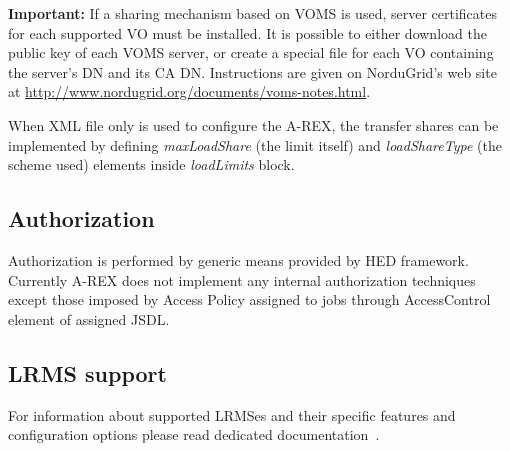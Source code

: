 \documentclass{article}                            %
\begin{document}
\textbf{Important:} If a sharing mechanism based on VOMS is used,
server certificates for each supported VO must be installed. It is
possible to either download the public key of each VOMS server, or
create a special file for each VO containing the server's DN and its
CA DN. Instructions are given on NorduGrid's web site at
\url{http://www.nordugrid.org/documents/voms-notes.html}.

When XML file only is used to configure the A-REX, the transfer shares
can be implemented by defining \emph{maxLoadShare} (the limit itself)
and \emph{loadShareType} (the scheme used) elements inside 
\emph{loadLimits} block.

\subsection{Authorization\label{sub:Authorization}}

Authorization is performed by generic means provided by HED framework.
Currently A-REX does not implement any internal authorization techniques
except those imposed by Access Policy assigned to jobs through AccessControl
element of assigned JSDL.

\subsection{LRMS support\label{sub:LRMS}}

For information about supported LRMSes and their specific features
and configuration options please read dedicated documentation~\cite{arc1-backends}.
\end{document}
